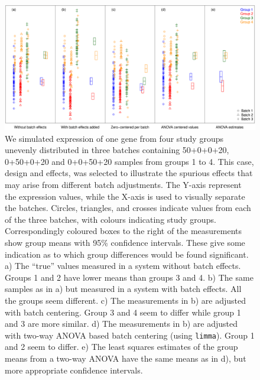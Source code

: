 \documentclass[oupdraft]{bio}
\begin{document}

\begin{figure}[!p]
\centering\includegraphics[width=13cm]{Fig/boxplots.pdf}
\caption{We simulated expression of one gene from four study groups unevenly distributed in three batches containing 50+0+0+20, 0+50+0+20 and 0+0+50+20 samples from groups 1 to 4. This case, design and effects, was selected to illustrate the spurious effects that may arise from different batch adjustments. The Y-axis represent the expression values, while the X-axis is used to visually separate the batches. Circles, triangles, and crosses indicate values from each of the three batches, with colours indicating study groups. Correspondingly coloured boxes to the right of the measurements show group means with 95\% confidence intervals. These give some indication as to which group differences would be found significant.
a) The ``true'' values measured in a system without batch effects. Groups 1 and 2 have lower means than groups 3 and 4.
b) The same samples as in a) but measured in a system with batch effects. All the groups seem different.
c) The measurements in b) are adjusted with batch centering. Group 3 and 4 seem to differ while group 1 and 3 are more similar.
d) The measurements in b) are adjusted with two-way ANOVA based batch centering (using \texttt{limma}). Group 1 and 2 seem to differ.
e) The least squares estimates of the group means from a two-way ANOVA have the same means as in d), but more appropriate confidence intervals.
}
\label{fig:boxplots}
\end{figure}
\end{document}
